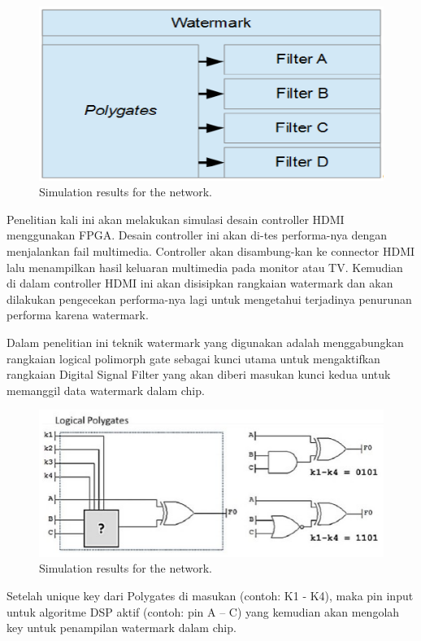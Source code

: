 \begin{figure}[!h]
	\centering
	\includegraphics[scale=0.8]{images/box}
	\caption{Simulation results for the network.}
	\label{fig_sim}
\end{figure}

Penelitian kali ini akan melakukan simulasi desain controller HDMI
menggunakan FPGA. Desain controller ini akan di-tes performa-nya dengan
menjalankan fail multimedia. Controller akan disambung-kan ke connector
HDMI lalu menampilkan hasil keluaran multimedia pada monitor atau TV.
Kemudian di dalam controller HDMI ini akan disisipkan rangkaian watermark
dan akan dilakukan pengecekan performa-nya lagi untuk mengetahui terjadinya
penurunan performa karena watermark.

Dalam penelitian ini teknik watermark yang digunakan adalah
menggabungkan rangkaian logical polimorph gate sebagai kunci utama untuk
mengaktifkan rangkaian Digital Signal Filter yang akan diberi masukan kunci
kedua untuk memanggil data watermark dalam chip.

\begin{figure}[!h]
	\centering
	\includegraphics[scale=0.8]{images/polymorphgate}
	\caption{Simulation results for the network.}
	\label{fig_sim}
\end{figure}


Setelah unique key dari Polygates di masukan (contoh: K1 - K4), maka pin
input untuk algoritme DSP aktif (contoh: pin A – C) yang kemudian akan
mengolah key untuk penampilan watermark dalam chip.

